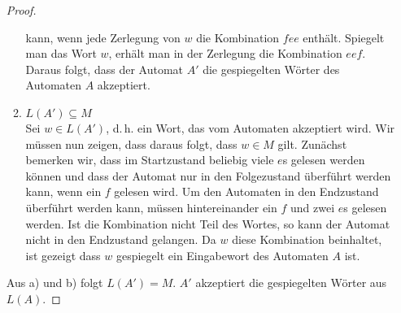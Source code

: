 \documentclass[a4paper]{scrartcl}
\begin{document}
\begin{enumerate}
\begin{proof}
\begin{enumerate}
                    kann, wenn jede Zerlegung von $w$ die Kombination $fee$
                    enthält.
                    Spiegelt man das Wort $w$, erhält man in der Zerlegung die
                    Kombination $eef$.
                    Daraus folgt, dass der Automat $A'$ die gespiegelten Wörter
                    des Automaten $A$ akzeptiert.
                \item $L(A') \subseteq M$ \\
                    Sei $w \in L(A')$, d.\,h. ein Wort, das vom Automaten
                    akzeptiert wird.
                    Wir müssen nun zeigen, dass daraus folgt, dass $w \in M$
                    gilt.
                    Zunächst bemerken wir, dass im Startzustand beliebig viele
                    $e$s gelesen werden können und dass der Automat nur in den
                    Folgezustand überführt werden kann, wenn ein $f$ gelesen
                    wird.
                    Um den Automaten in den Endzustand überführt werden kann,
                    müssen hintereinander ein $f$ und zwei $e$s gelesen werden.
                    Ist die Kombination nicht Teil des Wortes, so kann der
                    Automat nicht in den Endzustand gelangen.
                    Da $w$ diese Kombination beinhaltet, ist gezeigt dass $w$
                    gespiegelt ein Eingabewort des Automaten $A$ ist.
            \end{enumerate}
            Aus a) und b) folgt $L(A') = M$.
            $A'$ akzeptiert die gespiegelten Wörter aus $L(A)$.
        \end{proof}

    	
\end{enumerate}
\end{document}
